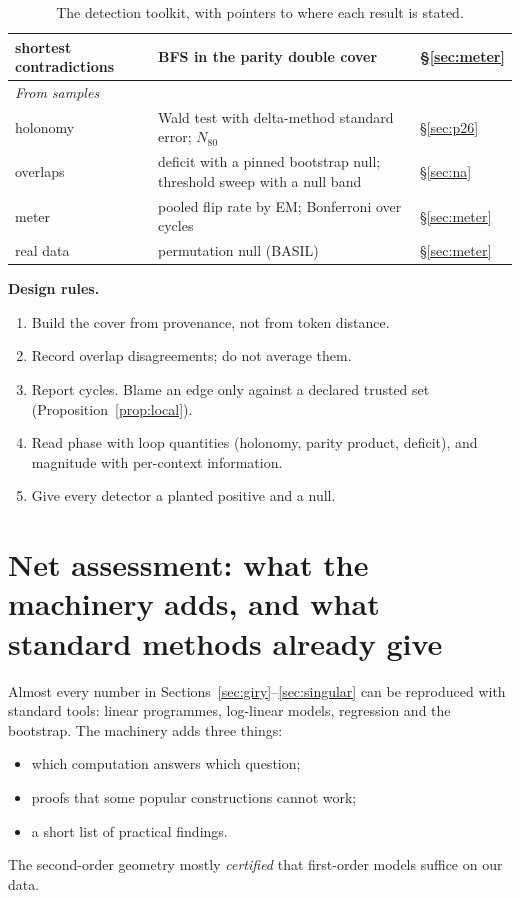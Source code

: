 \documentclass[11pt]{article}
\theoremstyle{definition}
\theoremstyle{remark}
\begin{document}
\begin{table}[!htbp]
\begin{tabular}{p{3.9cm}p{6.6cm}p{2.9cm}}
shortest contradictions & BFS in the parity double cover & \S\ref{sec:meter}\\
\midrule
\multicolumn{3}{l}{\emph{From samples}}\\
holonomy & Wald test with delta-method standard error; $N_{80}$ & \S\ref{sec:p26}\\
overlaps & deficit with a pinned bootstrap null; threshold sweep with a null band & \S\ref{sec:na}\\
meter & pooled flip rate by EM; Bonferroni over cycles & \S\ref{sec:meter}\\
real data & permutation null (BASIL) & \S\ref{sec:meter}\\
\bottomrule
\end{tabular}
\caption{The detection toolkit, with pointers to where each result is stated.}
\end{table}

\noindent\textbf{Design rules.}
\begin{enumerate}
  \item Build the cover from provenance, not from token distance.
  \item Record overlap disagreements; do not average them.
  \item Report cycles. Blame an edge only against a declared trusted set (Proposition~\ref{prop:local}).
  \item Read phase with loop quantities (holonomy, parity product, deficit), and magnitude with per-context information.
  \item Give every detector a planted positive and a null.
\end{enumerate}

\section{Net assessment: what the machinery adds, and what standard methods already give}\label{sec:net}
Almost every number in Sections~\ref{sec:giry}--\ref{sec:singular} can be reproduced with standard tools: linear programmes, log-linear models, regression and the bootstrap. The machinery adds three things:
\begin{itemize}
  \item which computation answers which question;
  \item proofs that some popular constructions cannot work;
  \item a short list of practical findings.
\end{itemize}
The second-order geometry mostly \emph{certified} that first-order models suffice on our data.
\end{document}
